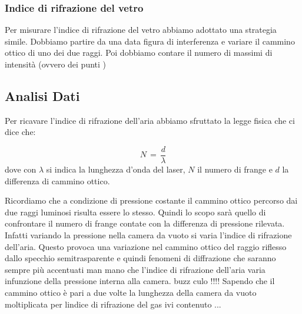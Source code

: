 \subsubsection{Indice di rifrazione del vetro}

Per misurare l'indice di rifrazione del vetro abbiamo adottato una strategia simile. Dobbiamo partire da una data figura di interferenza e variare il cammino ottico di uno dei due raggi. Poi dobbiamo contare il numero di massimi di intensità (ovvero dei punti )

\subsection{Analisi Dati}

Per ricavare l'indice di rifrazione dell'aria abbiamo sfruttato la legge fisica che ci dice che:

\begin{equation}
	N \,=\, \frac{d}{\lambda}
\end{equation}
%
dove con $\lambda$ si indica la lunghezza d'onda del laser, $N$ il numero di frange e $d$ la differenza di cammino ottico.

Ricordiamo che a condizione di pressione costante il cammino ottico percorso dai due raggi luminosi risulta essere lo stesso.
Quindi lo scopo sarà quello di confrontare il numero di frange contate con la differenza di pressione rilevata. Infatti variando la pressione nella camera da vuoto si varia l'indice di rifrazione dell'aria. Questo provoca una variazione nel cammino ottico del raggio riflesso dallo specchio semitrasparente e quindi fenomeni di diffrazione che saranno sempre più accentuati man mano che l'indice di rifrazione dell'aria varia infunzione della pressione interna alla camera. buzz culo !!!!
Sapendo che il cammino ottico è pari a due volte la lunghezza della camera da vuoto moltiplicata per lindice di rifrazione del gas ivi contenuto ...
